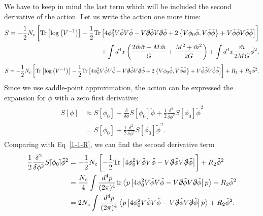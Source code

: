 \documentclass[tightenlines,floatfix,nofootinbib,superscriptaddress,fleqn]{revtex4-2}
\begin{document}
We have to keep in mind the last term which will be included the second derivative of the action.
Let us write the action one more time:
\begin{align}
  \begin{split}
    S=-\frac{1}{2}N_c\left[\mathrm{Tr}
    \left[\log\left(V^{-1}\right)\right]
    -\frac{1}{2}\mathrm{Tr}\left[
    4\phi_0^2V\tilde{\phi}V\tilde{\phi}
    -V\slashed{\partial}\tilde{\phi}
     V\slashed{\partial}\tilde{\phi}
    +2\left\{V\phi_0\tilde{\phi},V\tilde{\phi}\tilde{\phi}
    \right\}
    +V\tilde{\phi}\tilde{\phi}V\tilde{\phi}\tilde{\phi}
    \right]\right]\\
    \,\,\,\,\,
    +\int d^4x\left(
    \frac{2\hat{m}\tilde{\sigma}-M\hat{m}}{G}
    +\frac{M^2+\hat{m}^2}{2G}\right)
    +\int d^4x\frac{\hat{m}}{2MG}\tilde{\phi}^2,
  \end{split}
\end{align}
\begin{align}\label{1-1-R}
  S=-\frac{1}{2}N_c\left[\mathrm{Tr}
  \left[\log\left(V^{-1}\right)\right]
  -\frac{1}{2}\mathrm{Tr}\left[
  4\phi_0^2V\tilde{\phi}V\tilde{\phi}
  -V\slashed{\partial}\tilde{\phi}
   V\slashed{\partial}\tilde{\phi}
  +2\left\{V\phi_0\tilde{\phi},V\tilde{\phi}\tilde{\phi}
  \right\}
  +V\tilde{\phi}\tilde{\phi}V\tilde{\phi}\tilde{\phi}
  \right]\right]+R_1+R_2\tilde{\phi}^2.
\end{align}
Since we use saddle-point approximation, the action can be expressed the expansion for $\phi$
with a zero first derivative:
\begin{align}\label{1-1-9}
  \begin{split}
    S[\phi] &\approx S[\phi_0]+\frac{\delta}{\delta\phi}S[\phi_0]\tilde{\phi}
    +\frac{1}{2}\frac{\delta^2}{\delta\phi^2}S[\phi_0]\tilde{\phi}^2\\
    &=S[\phi_0]+\frac{1}{2}\frac{\delta^2}{\delta\phi^2}S[\phi_0]\tilde{\phi}^2.
  \end{split}
\end{align}
Comparing with Eq~\eqref{1-1-R}, we can find the second derivative term
\begin{align}\label{1-1-10}
  \begin{split}
    \frac{1}{2}\frac{\delta^2}{\delta\phi^2}S[\phi_0]\tilde{\phi}^2
    &=-\frac{1}{2}N_c\left[
      -\frac{1}{2}\mathrm{Tr}\left[
      4\phi_0^2V\tilde{\phi}V\tilde{\phi}
      -V\slashed{\partial}\tilde{\phi}
       V\slashed{\partial}\tilde{\phi}
      \right]
    \right]+R_2\tilde{\phi}^2\\
    &=\frac{N_c}{4}\int\frac{d^4p}{(2\pi)^4}
    \mathrm{tr}\left<p\left|4\phi_0^2V\tilde{\phi}V\tilde{\phi}
    -V\slashed{\partial}\tilde{\phi}
     V\slashed{\partial}\tilde{\phi}\right|p\right> +R_2\tilde{\phi}^2\\
     &=2N_c\int\frac{d^4p}{(2\pi)^4}
     \left<p\left|4\phi_0^2V\tilde{\phi}V\tilde{\phi}
     -V\slashed{\partial}\tilde{\phi}
      V\slashed{\partial}\tilde{\phi}\right|p\right>+R_2\tilde{\phi}^2.
  \end{split}
\end{align}
\end{document}
